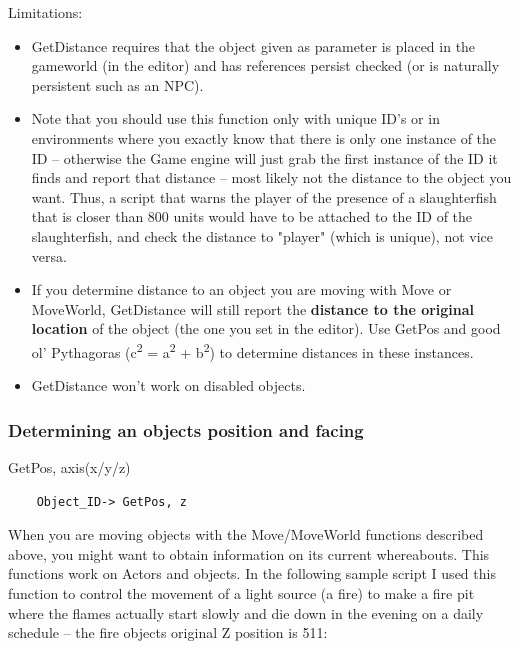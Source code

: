 Limitations:

\begin{itemize}
\item
  GetDistance requires that the object given as parameter is placed in
  the gameworld (in the editor) and has references persist checked (or
  is naturally persistent such as an NPC).
\item
  Note that you should use this function only with unique ID's or in
  environments where you exactly know that there is only one instance of
  the ID -- otherwise the Game engine will just grab the first instance
  of the ID it finds and report that distance -- most likely not the
  distance to the object you want. Thus, a script that warns the player
  of the presence of a slaughterfish that is closer than 800 units would
  have to be attached to the ID of the slaughterfish, and check the
  distance to "player" (which is unique), not vice versa.
\item
  If you determine distance to an object you are moving with Move or
  MoveWorld, GetDistance will still report the \textbf{distance to the
  original location} of the object (the one you set in the editor). Use
  GetPos and good ol' Pythagoras (c\textsuperscript{2} =
  a\textsuperscript{2} + b\textsuperscript{2}) to determine distances in
  these instances.
\item
  GetDistance won't work on disabled objects.
\end{itemize}

\hypertarget{determining-an-objects-position-and-facing}{%
\subsubsection{Determining an objects position and
facing}\label{determining-an-objects-position-and-facing}}

GetPos, axis(x/y/z)

\begin{lstlisting}
	Object_ID-> GetPos, z
\end{lstlisting}

When you are moving objects with the Move/MoveWorld functions described
above, you might want to obtain information on its current whereabouts.
This functions work on Actors and objects. In the following sample
script I used this function to control the movement of a light source (a
fire) to make a fire pit where the flames actually start slowly and die
down in the evening on a daily schedule -- the fire objects original Z
position is 511:

